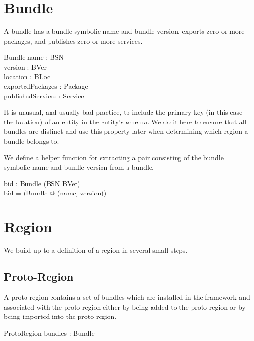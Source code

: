 \documentclass[a4paper,9pt]{article}
\begin{document}
\section{Bundle}
\label{cha:bundle}

A bundle has a bundle symbolic name and bundle version, exports zero or more packages, and
publishes zero or more services.

\begin{schema}{Bundle}
  name : BSN \\
  version : BVer \\
  location : BLoc \\
  exportedPackages : \power Package \\
  publishedServices : \power Service \\
\end{schema}
It is unusual, and usually bad practice, to include the primary key (in this case the location) of
an entity in the entity's schema.
We do it here to ensure that all bundles are
distinct and use this property later when determining which region a bundle belongs to.

We define a helper function for extracting a pair consisting of the bundle symbolic name and bundle
version from a bundle. 
\begin{axdef}
  bid : Bundle \fun (BSN \cross BVer) \\
\where
  bid =  (\lambda Bundle @ (name, version)) \\
\end{axdef}

\clearpage
\section{Region}
\label{cha:region}

We build up to a definition of a region in several small steps.

\subsection{Proto-Region}

A proto-region contains a set of bundles which are installed in the framework and associated with
the proto-region either by being added to the proto-region or by being imported into the proto-region.
\begin{schema}{ProtoRegion}
  bundles : \power Bundle \\
\end{schema}
\end{document}
